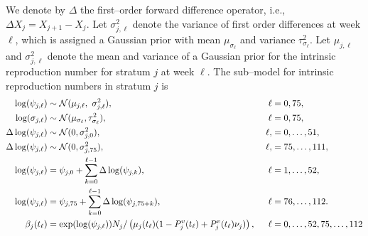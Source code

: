 We denote by $ \Delta $ the first--order forward difference operator, i.e., $ \Delta X_j = X_{j+1} - X_j $. Let $ \sigma^2_{j,\ell} $ denote the variance of first order differences at week $ \ell $, which is assigned a Gaussian prior with mean $ \mu_{\sigma_\ell} $ and variance $ \tau^2_{\sigma_\ell} $. Let $ \mu_{j,\ell}$ and $ \sigma^2_{j,\ell} $ denote the mean and variance of a Gaussian prior for the intrinsic reproduction number for stratum $ j $ at week $ \ell $. The sub--model for intrinsic reproduction numbers in stratum $ j $ is
\begin{align}
\label{eqn:flu_Rt_mod}
\log(\psi_{j,\ell}) &\sim \mcN(\mu_{j,\ell},\ \sigma_{j,\ell}^2),&\ \ell&= 0,75, \nonumber\\
\log(\sigma_{j,\ell}) &\sim \mcN(\mu_{\sigma_\ell}, \tau_{\sigma_\ell}^2),&\ \ell&=0,75, \nonumber\\
\Delta\log(\psi_{j,\ell})&\sim \mcN(0, \sigma^2_{j,0}),&\ \ell,&=0,\dots,51, \nonumber\\
\Delta\log(\psi_{j,\ell})&\sim \mcN(0, \sigma^2_{j,75}),&\ \ell,&=75,\dots,111, \nonumber\\
\log(\psi_{j,\ell}) &= \psi_{j,0} + \sum_{k=0}^{\ell-1}\Delta\log(\psi_{j,k}),&\ \ell &= 1,\dots,52, \nonumber\\
\log(\psi_{j,\ell}) &= \psi_{j,75} + \sum_{k=0}^{\ell-1}\Delta\log(\psi_{j,75+k}),&\ \ell &= 76,\dots,112. \nonumber \\
\beta_j(t_\ell) &= \exp(\log(\psi_{j,\ell}))N_j/\left (\mu_{j}(t_\ell)(1 - P^v_j(t_\ell) + P_j^v(t_\ell)\nu_j)\right ),&\ \ell&=0,\dots,52,75,\dots,112 \nonumber
\end{align}

